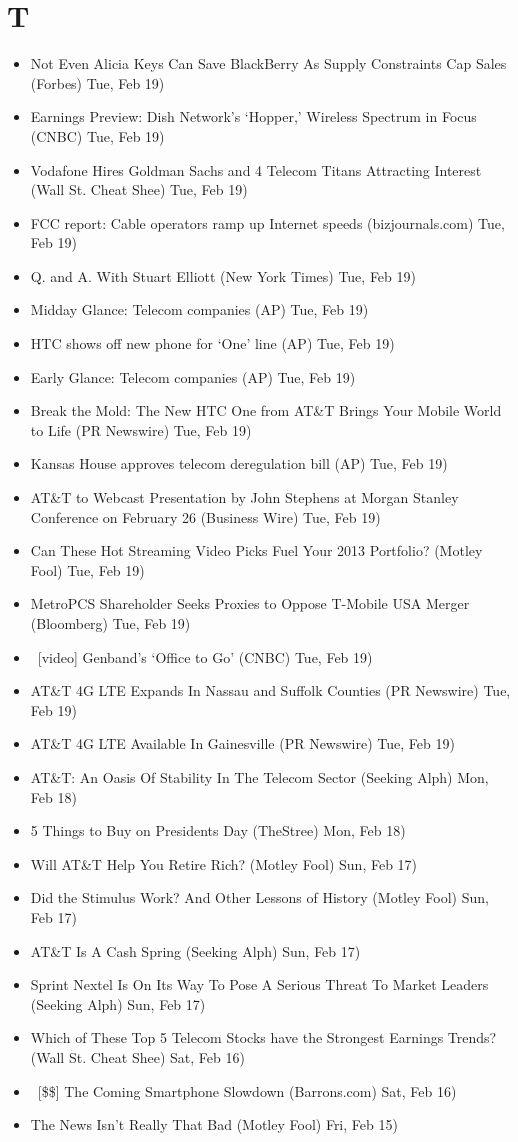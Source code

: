 \documentclass[11pt,asymmetric]{article}
\begin{document}
\section*{T}
\begin{itemize}
\item Not Even Alicia Keys Can Save BlackBerry As Supply Constraints Cap Sales (Forbes) Tue, Feb 19)
\item Earnings Preview: Dish Network's `Hopper,' Wireless Spectrum in Focus (CNBC) Tue, Feb 19)
\item Vodafone Hires Goldman Sachs and 4 Telecom Titans Attracting Interest (Wall St. Cheat Shee) Tue, Feb 19)
\item FCC report: Cable operators ramp up Internet speeds (bizjournals.com) Tue, Feb 19)
\item Q. and A. With Stuart Elliott (New York Times) Tue, Feb 19)
\item Midday Glance: Telecom companies (AP) Tue, Feb 19)
\item HTC shows off new phone for `One' line (AP) Tue, Feb 19)
\item Early Glance: Telecom companies (AP) Tue, Feb 19)
\item Break the Mold: The New HTC One from AT\&T Brings Your Mobile World to Life (PR Newswire) Tue, Feb 19)
\item Kansas House approves telecom deregulation bill (AP) Tue, Feb 19)
\item AT\&T to Webcast Presentation by John Stephens at Morgan Stanley Conference on February 26 (Business Wire) Tue, Feb 19)
\item Can These Hot Streaming Video Picks Fuel Your 2013 Portfolio? (Motley Fool) Tue, Feb 19)
\item MetroPCS Shareholder Seeks Proxies to Oppose T-Mobile USA Merger (Bloomberg) Tue, Feb 19)
\item\ [video] Genband's `Office to Go' (CNBC) Tue, Feb 19)
\item AT\&T 4G LTE Expands In Nassau and Suffolk Counties (PR Newswire) Tue, Feb 19)
\item AT\&T 4G LTE Available In Gainesville (PR Newswire) Tue, Feb 19)
\item AT\&T: An Oasis Of Stability In The Telecom Sector (Seeking Alph) Mon, Feb 18)
\item 5 Things to Buy on Presidents Day (TheStree) Mon, Feb 18)
\item Will AT\&T Help You Retire Rich? (Motley Fool) Sun, Feb 17)
\item Did the Stimulus Work? And Other Lessons of History (Motley Fool) Sun, Feb 17)
\item AT\&T Is A Cash Spring (Seeking Alph) Sun, Feb 17)
\item Sprint Nextel Is On Its Way To Pose A Serious Threat To Market Leaders (Seeking Alph) Sun, Feb 17)
\item Which of These Top 5 Telecom Stocks have the Strongest Earnings Trends? (Wall St. Cheat Shee) Sat, Feb 16)
\item\ [\$\$] The Coming Smartphone Slowdown (Barrons.com) Sat, Feb 16)
\item The News Isn't Really That Bad (Motley Fool) Fri, Feb 15)
\end{itemize}
\end{document}
